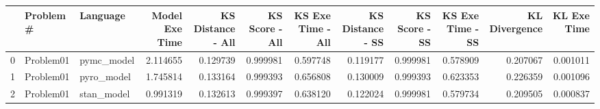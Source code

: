 \begin{tabular}{lllrrrrrrrrr}
\toprule
 & Problem # & Language & Model Exe Time & KS Distance - All & KS Score - All & KS Exe Time - All & KS Distance - SS & KS Score - SS & KS Exe Time - SS & KL Divergence & KL Exe Time \\
\midrule
0 & Problem01 & pymc_model & 2.114655 & 0.129739 & 0.999981 & 0.597748 & 0.119177 & 0.999981 & 0.578909 & 0.207067 & 0.001011 \\
1 & Problem01 & pyro_model & 1.745814 & 0.133164 & 0.999393 & 0.656808 & 0.130009 & 0.999393 & 0.623353 & 0.226359 & 0.001096 \\
2 & Problem01 & stan_model & 0.991319 & 0.132613 & 0.999397 & 0.638120 & 0.122024 & 0.999981 & 0.579734 & 0.209505 & 0.000837 \\
\bottomrule
\end{tabular}
